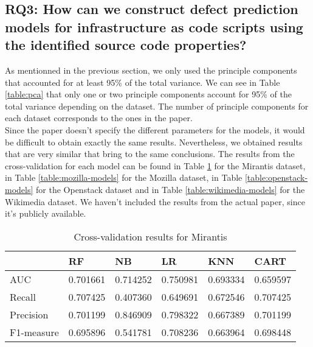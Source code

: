 \subsection{RQ3: How can we construct defect prediction models for
    infrastructure as code scripts using the identified source code properties?}
As mentionned in the previous section, we only used the principle components
that accounted for at least 95\% of the total variance. We can see in Table
\ref{table:pca} that only one or two principle components account for 95\% of
the total variance depending on the dataset. The number of principle components
for each dataset corresponds to the ones in the paper.\\

Since the paper doesn't specify the different parameters for the models,
it would be difficult to obtain exactly the same results. Nevertheless, we
obtained results that are very similar that bring to the same conclusions.
The results from the cross-validation for each model can be found in Table
\ref{table:mirantis-models} for the Mirantis dataset, in Table \ref{table:mozilla-models}
for the Mozilla dataset, in Table \ref{table:openstack-models} for the Openstack
dataset and in Table \ref{table:wikimedia-models} for the Wikimedia dataset.
We haven't included the results from the actual paper, since it's publicly
available.



\begin{table}[h]
    \caption{Cross-validation results for Mirantis}
    \label{table:mirantis-models}
    \centering
    \begin{tabular}{|l|l|l|l|l|l|}
        \hline
        ~          & RF       & NB       & LR       & KNN      & CART     \\ \hline
        AUC        & 0.701661 & 0.714252 & 0.750981 & 0.693334 & 0.659597 \\ \hline
        Recall     & 0.707425 & 0.407360 & 0.649691 & 0.672546 & 0.707425 \\ \hline
        Precision  & 0.701199 & 0.846909 & 0.798322 & 0.667389 & 0.701199 \\ \hline
        F1-measure & 0.695896 & 0.541781 & 0.708236 & 0.663964 & 0.698448 \\ \hline
    \end{tabular}
\end{table}

